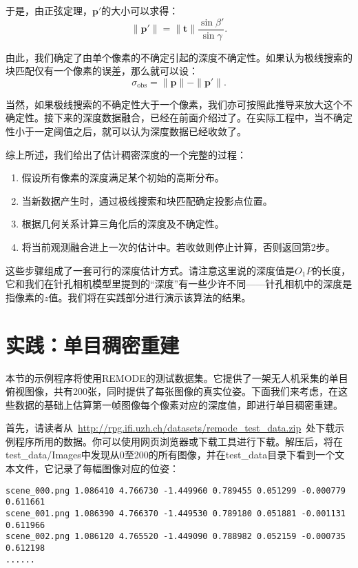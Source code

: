 于是，由正弦定理，$\bm{p}'$的大小可以求得：
\begin{equation}
\| \bm{p}' \| = \| \bm{t} \| \frac{{\sin \beta '}}{{\sin \gamma }}.
\end{equation}

由此，我们确定了由单个像素的不确定引起的深度不确定性。如果认为极线搜索的块匹配仅有一个像素的误差，那么就可以设：
\begin{equation}
\sigma_{\mathrm{obs}} = \| \bm{p} \|-\| \bm{p}' \|.
\end{equation}

当然，如果极线搜索的不确定性大于一个像素，我们亦可按照此推导来放大这个不确定性。接下来的深度数据融合，已经在前面介绍过了。在实际工程中，当不确定性小于一定阈值之后，就可以认为深度数据已经收敛了。

综上所述，我们给出了估计稠密深度的一个完整的过程：
\begin{mdframed}
\begin{enumerate}
	\item 假设所有像素的深度满足某个初始的高斯分布。
	\item 当新数据产生时，通过极线搜索和块匹配确定投影点位置。
	\item 根据几何关系计算三角化后的深度及不确定性。
	\item 将当前观测融合进上一次的估计中。若收敛则停止计算，否则返回第2步。
\end{enumerate}
\end{mdframed}

这些步骤组成了一套可行的深度估计方式。请注意这里说的深度值是$O_1 P$的长度，它和我们在针孔相机模型里提到的“深度”有一些少许不同——针孔相机中的深度是指像素的$z$值。我们将在实践部分进行演示该算法的结果。

\section{实践：单目稠密重建}
本节的示例程序将使用REMODE\textsuperscript{\cite{Handa2012, Pizzoli2014}}的测试数据集。它提供了一架无人机采集的单目俯视图像，共有200张，同时提供了每张图像的真实位姿。下面我们来考虑，在这些数据的基础上估算第一帧图像每个像素对应的深度值，即进行单目稠密重建。

首先，请读者从~\url{http://rpg.ifi.uzh.ch/datasets/remode_test_data.zip}~处下载示例程序所用的数据。你可以使用网页浏览器或下载工具进行下载。解压后，将在test\_data/Images中发现从0至200的所有图像，并在test\_data目录下看到一个文本文件，它记录了每幅图像对应的位姿：
\begin{lstlisting}
scene_000.png 1.086410 4.766730 -1.449960 0.789455 0.051299 -0.000779 0.611661
scene_001.png 1.086390 4.766370 -1.449530 0.789180 0.051881 -0.001131 0.611966
scene_002.png 1.086120 4.765520 -1.449090 0.788982 0.052159 -0.000735 0.612198
......
\end{lstlisting}

